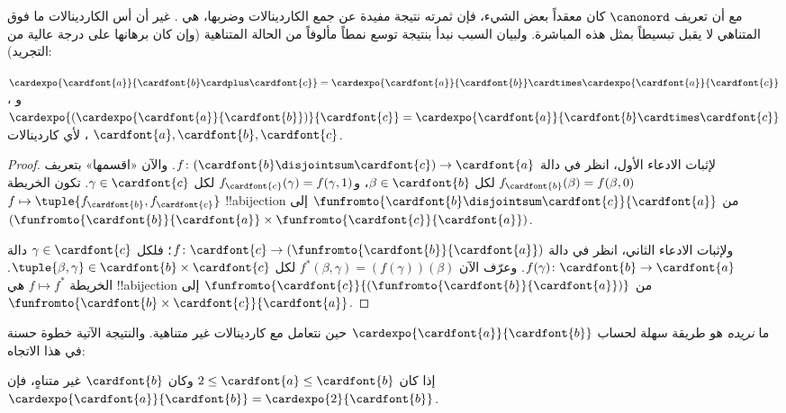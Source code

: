 \documentclass[../../../include/open-logic-section]{subfiles}
\begin{document}


مع أن تعريف $\canonord$ كان معقداً بعض الشيء، فإن ثمرته نتيجة مفيدة عن
جمع الكاردينالات وضربها، هي . غير أن أس
الكاردينالات ما فوق المتناهي لا يقبل تبسيطاً بمثل هذه المباشرة. ولبيان
السبب نبدأ بنتيجة توسع نمطاً مألوفاً من الحالة المتناهية (وإن كان
برهانها على درجة عالية من التجريد):

\begin{prop}
$\cardexpo{\cardfont{a}}{\cardfont{b} \cardplus \cardfont{c}} =
\cardexpo{\cardfont{a}}{\cardfont{b}} \cardtimes
\cardexpo{\cardfont{a}}{\cardfont{c}}$، و
$\cardexpo{(\cardexpo{\cardfont{a}}{\cardfont{b}})}{\cardfont{c}} =
\cardexpo{\cardfont{a}}{\cardfont{b} \cardtimes \cardfont{c}}$، لأي
كاردينالات $\cardfont{a}, \cardfont{b}, \cardfont{c}$.
\end{prop}

\begin{proof}
لإثبات الادعاء الأول، انظر في دالة
$f \colon (\cardfont{b}\disjointsum\cardfont{c}) \to \cardfont{a}$.
والآن «اقسمها» بتعريف $f_\cardfont{b}(\beta) = f(\beta, 0)$ لكل
$\beta \in \cardfont{b}$، و$f_\cardfont{c}(\gamma) = f(\gamma, 1)$
لكل $\gamma \in \cardfont{c}$. تكون الخريطة
$f \mapsto \tuple{f_{\cardfont{b}}, f_{\cardfont{c}}}$
!!a{bijection} من
$\funfromto{\cardfont{b} \disjointsum \cardfont{c}}{\cardfont{a}}$ إلى
$(\funfromto{\cardfont{b}}{\cardfont{a}} \times
\funfromto{\cardfont{c}}{\cardfont{a}})$.

ولإثبات الادعاء الثاني، انظر في دالة
$f \colon \cardfont{c} \to
(\funfromto{\cardfont{b}}{\cardfont{a}})$؛ فلكل
$\gamma \in \cardfont{c}$ دالة
$f(\gamma) \colon \cardfont{b} \to \cardfont{a}$. وعرّف الآن
$f^*(\beta, \gamma) = (f(\gamma))(\beta)$ لكل
$\tuple{\beta, \gamma} \in \cardfont{b} \times \cardfont{c}$.
الخريطة $f \mapsto f^*$ هي !!a{bijection} من
$\funfromto{\cardfont{c}}{(\funfromto{\cardfont{b}}{\cardfont{a}})}$
إلى $\funfromto{\cardfont{b} \times \cardfont{c}}{\cardfont{a}}$.
\end{proof}

ما \emph{نريده} هو طريقة سهلة لحساب
$\cardexpo{\cardfont{a}}{\cardfont{b}}$ حين نتعامل مع كاردينالات غير
متناهية. والنتيجة الآتية خطوة حسنة في هذا الاتجاه:

\begin{prop}
إذا كان $2 \leq \cardfont{a} \leq \cardfont{b}$ وكان
$\cardfont{b}$ غير متناهٍ، فإن
$\cardexpo{\cardfont{a}}{\cardfont{b}} =
\cardexpo{2}{\cardfont{b}}$.
\end{prop}
\end{document}
